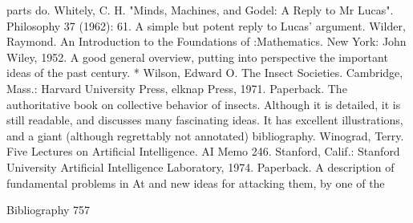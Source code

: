   parts do.
Whitely, C. H. "Minds, Machines, and Godel: A Reply to Mr Lucas". Philosophy 37
  (1962): 61. A simple but potent reply to Lucas' argument. Wilder, Raymond. An
  Introduction to the Foundations of :Mathematics. New York: John Wiley, 1952. A good
  general overview, putting into perspective the important ideas of the past century.
* Wilson, Edward O. The Insect Societies. Cambridge, Mass.: Harvard University Press,
  elknap Press, 1971. Paperback. The authoritative book on collective behavior of insects.
  Although it is detailed, it is still readable, and discusses many fascinating ideas. It has
  excellent illustrations, and a giant (although regrettably not annotated) bibliography.
Winograd, Terry. Five Lectures on Artificial Intelligence. AI Memo 246. Stanford, Calif.:
  Stanford University Artificial Intelligence Laboratory, 1974. Paperback. A description
  of fundamental problems in At and new ideas for attacking them, by one of the

Bibliography                                                                             757

